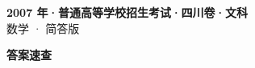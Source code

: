 \documentclass[zihao=-4, a4paper]{ctexart}
\begin{document}
\begin{center}
  {\Large\bfseries 2007 年·普通高等学校招生考试·四川卷·文科}\\[4pt]
  {\large 数学 · 简答版}
\end{center}
\medskip
{}

\clearpage
{}
\begin{center}{\Large\bfseries 答案速查}\end{center}
\medskip

\end{document}
